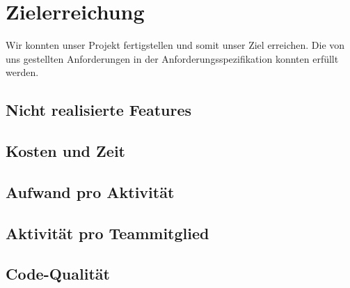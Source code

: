 \chapter{Zielerreichung}
	Wir konnten unser Projekt fertigstellen und somit unser Ziel erreichen. Die von uns gestellten Anforderungen in der Anforderungsspezifikation konnten erfüllt werden. 
	\section{Nicht realisierte Features}
	
	
	\section{Kosten und Zeit}
	

	\section{Aufwand pro Aktivität}
	
	\section{Aktivität pro Teammitglied}
	
	\section{Code-Qualität}
	